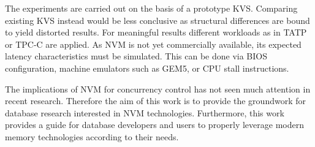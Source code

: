 The experiments are carried out on the basis of a prototype KVS. Comparing existing KVS instead would be less conclusive as structural differences are bound to yield distorted results. For meaningful results different workloads as in TATP or TPC-C are applied. As NVM is not yet commercially available, its expected latency characteristics must be simulated. This can be done via BIOS configuration, machine emulators such as GEM5, or CPU stall instructions.

The implications of NVM for concurrency control has not seen much attention in recent research. Therefore the aim of this work is to provide the groundwork for database research interested in NVM technologies. Furthermore, this work provides a guide for database developers and users to properly leverage modern memory technologies according to their needs.
